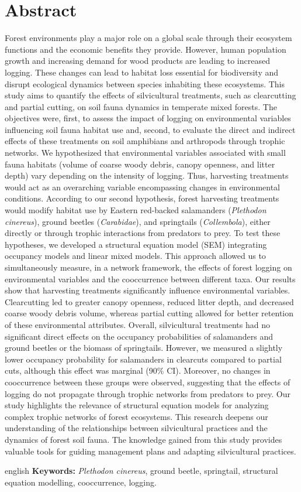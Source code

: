 \chapter*{Abstract}             %
\label{chap-abstract}           %

Forest environments play a major role on a global scale through their ecosystem functions and the economic benefits they provide. 
However, human population growth and increasing demand for wood products are leading to increased logging. 
These changes can lead to habitat loss essential for biodiversity and disrupt ecological dynamics between species inhabiting these ecosystems. 
This study aims to quantify the effects of silvicultural treatments, such as clearcutting and partial cutting, on soil fauna dynamics in temperate mixed forests. 
The objectives were, first, to assess the impact of logging on environmental variables influencing soil fauna habitat use and, second, 
to evaluate the direct and indirect effects of these treatments on soil amphibians and arthropods through trophic networks. 
We hypothesized that environmental variables associated with small fauna habitats (volume of coarse woody debris, canopy openness, and litter depth) vary depending on the intensity of logging. 
Thus, harvesting treatments would act as an overarching variable encompassing changes in environmental conditions. 
According to our second hypothesis, forest harvesting treatments would modify habitat use by Eastern red-backed salamanders (\textit{Plethodon cinereus}), ground beetles (\textit{Carabidae}), and springtails (\textit{Collembola}), 
either directly or through trophic interactions from predators to prey. 
To test these hypotheses, we developed a structural equation model (SEM) integrating occupancy models and linear mixed models. 
This approach allowed us to simultaneously measure, in a network framework, the effects of forest logging on environmental variables and the cooccurrence between different taxa. 
Our results show that harvesting treatments significantly influence environmental variables. 
Clearcutting led to greater canopy openness, reduced litter depth, and decreased coarse woody debris volume,  
whereas partial cutting allowed for better retention of these environmental attributes. 
Overall, silvicultural treatments had no significant direct effects on the occupancy probabilities of salamanders and ground beetles or the biomass of springtails. 
However, we measured a slightly lower occupancy probability for salamanders in clearcuts compared to partial cuts, although this effect was marginal (90\% CI). 
Moreover, no changes in cooccurrence between these groups were observed, suggesting that the effects of logging do not propagate through trophic networks from predators to prey. 
Our study highlights the relevance of structural equation models for analyzing complex trophic networks of forest ecosystems. 
This research deepens our understanding of the relationships between silvicultural practices and the dynamics of forest soil fauna. 
The knowledge gained from this study provides valuable tools for guiding management plans and adapting silvicultural practices. 

\begin{otherlanguage*}{english}
  \textbf{Keywords:} \textit{Plethodon cinereus}, ground beetle, springtail, structural equation modelling, cooccurrence, logging.
  
\end{otherlanguage*}
